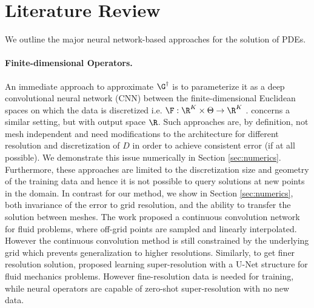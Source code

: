 \section{Literature Review}
\label{ssec:related-work}

We outline the major neural network-based approaches for the solution of PDEs. 
\paragraph{Finite-dimensional Operators.}
An immediate approach to approximate \(\G^\dagger\) is to parameterize it as a deep convolutional neural network (CNN) between the finite-dimensional Euclidean spaces on which the data is discretized i.e. \(\F : \R^K \times \Theta \to \R^K\) \citep{guo2016convolutional, Zabaras, Adler2017, bhatnagar2019prediction,kutyniok2022atheoretical}.  \citet{khoo2017solving}
concerns a similar setting, but with output space $\R$. Such approaches are, by definition, not mesh independent and need modifications to the architecture for different resolution and discretization of \(D\) in order to achieve consistent error (if at all possible). We demonstrate this issue numerically in Section \ref{sec:numerics}. Furthermore, these approaches are limited to the discretization size and geometry of the training data and hence it is not possible to query solutions at new points in the domain. In contrast for our method, we show in Section \ref{sec:numerics}, both invariance of the error to grid resolution, and the ability to transfer the solution between meshes.
The work \citet{ummenhofer2020lagrangian} proposed a continuous convolution network for fluid problems, where off-grid points are sampled and linearly interpolated. However the continuous convolution method is still constrained by the underlying grid which prevents generalization to higher resolutions. Similarly, to get finer resolution solution, \citet{jiang2020meshfreeflownet} proposed learning super-resolution with a U-Net structure for fluid mechanics problems. However fine-resolution data is needed for training, while neural operators are capable of zero-shot super-resolution with no new data.


